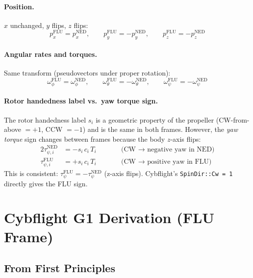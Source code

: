 \documentclass[11pt]{article}
\newcommand{\ned}{\mathrm{NED}}
\newcommand{\flu}{\mathrm{FLU}}
\begin{document}
\paragraph{Position.} $x$ unchanged, $y$ flips, $z$ flips:
\begin{equation}
    p_x^{\flu} = p_x^{\ned}, \qquad
    p_y^{\flu} = -p_y^{\ned}, \qquad
    p_z^{\flu} = -p_z^{\ned}
\end{equation}

\paragraph{Angular rates and torques.} Same transform (pseudovectors under proper rotation):
\begin{equation}
    \omega_\phi^{\flu} = \omega_\phi^{\ned}, \qquad
    \omega_\theta^{\flu} = -\omega_\theta^{\ned}, \qquad
    \omega_\psi^{\flu} = -\omega_\psi^{\ned}
\end{equation}

\paragraph{Rotor handedness label vs.\ yaw torque sign.}
The rotor handedness label $s_i$ is a geometric property of the propeller
(CW-from-above $= +1$, CCW $= -1$) and is the same in both frames.
However, the \emph{yaw torque} sign changes between frames because the
body $z$-axis flips:
\begin{alignat}{2}
    \tau_{\psi,i}^{\ned} &= -s_i \, c_i \, T_i &\qquad& \text{(CW $\to$ negative yaw in NED)} \\
    \tau_{\psi,i}^{\flu} &= +s_i \, c_i \, T_i && \text{(CW $\to$ positive yaw in FLU)}
\end{alignat}
This is consistent: $\tau_\psi^{\flu} = -\tau_\psi^{\ned}$ (z-axis flips).
Cybflight's \texttt{SpinDir::Cw = 1} directly gives the FLU sign.

\section{Cybflight G1 Derivation (FLU Frame)}

\subsection{From First Principles}
\end{document}
